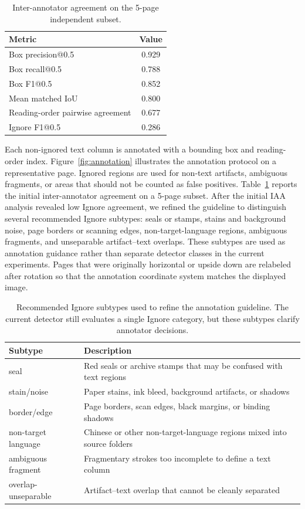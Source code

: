 \documentclass[pdflatex,sn-mathphys-num]{sn-jnl}
\begin{document}
\begin{table}[t]
\centering
\scriptsize\setlength{\tabcolsep}{3pt}
\caption{Inter-annotator agreement on the 5-page independent subset.}
\label{tab:iaa}
\begin{tabular}{lc}
\toprule
Metric & Value \\
\midrule
Box precision@0.5 & 0.929 \\
Box recall@0.5 & 0.788 \\
Box F1@0.5 & 0.852 \\
Mean matched IoU & 0.800 \\
Reading-order pairwise agreement & 0.677 \\
Ignore F1@0.5 & 0.286 \\
\bottomrule
\end{tabular}
\end{table}

Each non-ignored text column is annotated with a bounding box and reading-order index. Figure~\ref{fig:annotation} illustrates the annotation protocol on a representative page. Ignored regions are used for non-text artifacts, ambiguous fragments, or areas that should not be counted as false positives. Table~\ref{tab:iaa} reports the initial inter-annotator agreement on a 5-page subset. After the initial IAA analysis revealed low Ignore agreement, we refined the guideline to distinguish several recommended Ignore subtypes: seals or stamps, stains and background noise, page borders or scanning edges, non-target-language regions, ambiguous fragments, and unseparable artifact--text overlaps. These subtypes are used as annotation guidance rather than separate detector classes in the current experiments. Pages that were originally horizontal or upside down are relabeled after rotation so that the annotation coordinate system matches the displayed image.

\begin{table}[t]
\centering
\scriptsize\setlength{\tabcolsep}{3pt}
\caption{Recommended Ignore subtypes used to refine the annotation guideline. The current detector still evaluates a single Ignore category, but these subtypes clarify annotator decisions.}
\label{tab:ignore_subtypes}
\begin{tabular}{lp{}}
\toprule
Subtype & Description \\
\midrule
seal & Red seals or archive stamps that may be confused with text regions \\
stain/noise & Paper stains, ink bleed, background artifacts, or shadows \\
border/edge & Page borders, scan edges, black margins, or binding shadows \\
non-target language & Chinese or other non-target-language regions mixed into source folders \\
ambiguous fragment & Fragmentary strokes too incomplete to define a text column \\
overlap-unseparable & Artifact--text overlap that cannot be cleanly separated \\
\bottomrule
\end{tabular}
\end{table}
\end{document}
